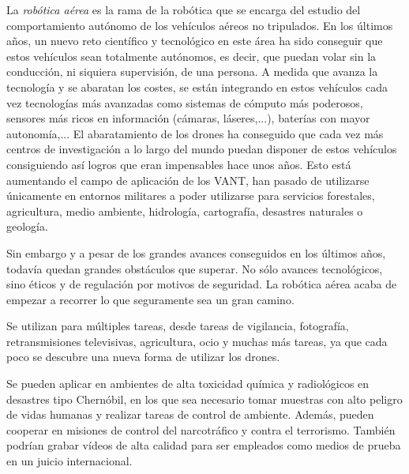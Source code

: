 La \textit{robótica aérea} es la rama de la robótica que se encarga del estudio del comportamiento autónomo de los vehículos aéreos no tripulados. En los últimos años, un nuevo reto científico y tecnológico en este área ha sido conseguir que estos vehículos sean totalmente autónomos, es decir, que puedan volar sin la conducción, ni siquiera supervisión, de una persona. A medida que avanza la tecnología y se abaratan los costes, se están integrando en estos vehículos cada vez tecnologías más avanzadas como sistemas de cómputo más poderosos, sensores más ricos en información (cámaras, láseres,...), baterías con mayor autonomía,... El abaratamiento de los drones ha conseguido que cada vez más centros de investigación a lo largo del mundo puedan disponer de estos vehículos consiguiendo así logros que eran impensables hace unos años. Esto está aumentando el campo de aplicación de los VANT, han pasado de utilizarse únicamente en entornos militares a poder utilizarse para servicios forestales, agricultura, medio ambiente, hidrología, cartografía, desastres naturales o geología. 

Sin embargo y a pesar de los grandes avances conseguidos en los últimos años, todavía quedan grandes obstáculos que superar. No sólo avances tecnológicos, sino éticos y de regulación por motivos de seguridad. La robótica aérea acaba de empezar a recorrer lo que seguramente sea un gran camino. 

Se utilizan para múltiples tareas, desde tareas de vigilancia, fotografía, retransmisiones televisivas, agricultura, ocio y muchas más tareas, ya que cada poco se descubre una nueva forma de utilizar los drones.

Se pueden aplicar en ambientes de alta toxicidad química y radiológicos en desastres tipo Chernóbil, en los que sea necesario tomar muestras con alto peligro de vidas humanas y realizar tareas de control de ambiente. Además, pueden cooperar en misiones de control del narcotráfico y contra el terrorismo. También podrían grabar vídeos de alta calidad para ser empleados como medios de prueba en un juicio internacional.

